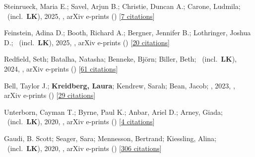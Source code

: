 \item[{\color{numcolor}\scriptsize14}] Steinrueck, Maria E.; Savel, Arjun B.; Christie, Duncan A.; Carone, Ludmila; \etal\ (incl.\ \textbf{LK}), 2025, , arXiv e-prints () [\href{https://ui.adsabs.harvard.edu/abs/2025arXiv250921588S}{7 citations}]

\item[{\color{numcolor}\scriptsize13}] Feinstein, Adina D.; Booth, Richard A.; Bergner, Jennifer B.; Lothringer, Joshua D.; \etal\ (incl.\ \textbf{LK}), 2025, , arXiv e-prints () [\href{https://ui.adsabs.harvard.edu/abs/2025arXiv250600669F}{20 citations}]

\item[{\color{numcolor}\scriptsize12}] Redfield, Seth; Batalha, Natasha; Benneke, Bj{\"o}rn; Biller, Beth; \etal\ (incl.\ \textbf{LK}), 2024, , arXiv e-prints () [\href{https://ui.adsabs.harvard.edu/abs/2024arXiv240402932R}{61 citations}]

\item[{\color{numcolor}\scriptsize11}] Bell, Taylor J.; \textbf{Kreidberg, Laura}; Kendrew, Sarah; Bean, Jacob; \etal, 2023, , arXiv e-prints () [\href{https://ui.adsabs.harvard.edu/abs/2023arXiv230106350B}{29 citations}]

\item[{\color{numcolor}\scriptsize10}] Unterborn, Cayman T.; Byrne, Paul K.; Anbar, Ariel D.; Arney, Giada; \etal\ (incl.\ \textbf{LK}), 2020, , arXiv e-prints () [\href{https://ui.adsabs.harvard.edu/abs/2020arXiv200708665U}{4 citations}]

\item[{\color{numcolor}\scriptsize9}] Gaudi, B. Scott; Seager, Sara; Mennesson, Bertrand; Kiessling, Alina; \etal\ (incl.\ \textbf{LK}), 2020, , arXiv e-prints () [\href{https://ui.adsabs.harvard.edu/abs/2020arXiv200106683G}{306 citations}]

